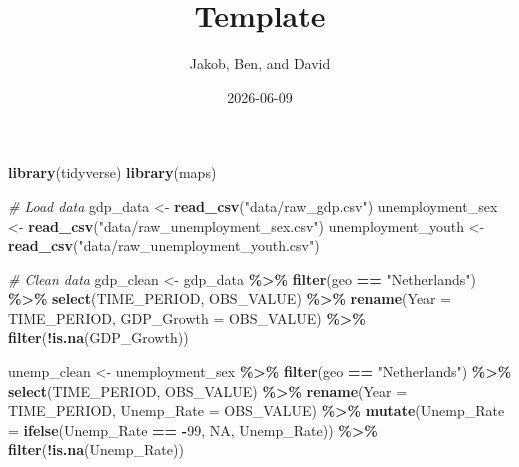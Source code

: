 \documentclass[
]{article}
\title{Template}
\author{Jakob, Ben, and David}
\date{2026-06-09}
\newenvironment{Shaded}{\begin{snugshade}}{\end{snugshade}}
\newcommand{\AttributeTok}[1]{\textcolor[rgb]{0.13,0.29,0.53}{#1}}
\newcommand{\CommentTok}[1]{\textcolor[rgb]{0.56,0.35,0.01}{\textit{#1}}}
\newcommand{\ConstantTok}[1]{\textcolor[rgb]{0.56,0.35,0.01}{#1}}
\newcommand{\DecValTok}[1]{\textcolor[rgb]{0.00,0.00,0.81}{#1}}
\newcommand{\FunctionTok}[1]{\textcolor[rgb]{0.13,0.29,0.53}{\textbf{#1}}}
\newcommand{\NormalTok}[1]{#1}
\newcommand{\OtherTok}[1]{\textcolor[rgb]{0.56,0.35,0.01}{#1}}
\newcommand{\SpecialCharTok}[1]{\textcolor[rgb]{0.81,0.36,0.00}{\textbf{#1}}}
\newcommand{\StringTok}[1]{\textcolor[rgb]{0.31,0.60,0.02}{#1}}
\begin{document}
\maketitle

\begin{Shaded}
\begin{Highlighting}[]
\FunctionTok{library}\NormalTok{(tidyverse)}
\FunctionTok{library}\NormalTok{(maps)}

\CommentTok{\# Load data}
\NormalTok{gdp\_data           }\OtherTok{\textless{}{-}} \FunctionTok{read\_csv}\NormalTok{(}\StringTok{"data/raw\_gdp.csv"}\NormalTok{)}
\NormalTok{unemployment\_sex   }\OtherTok{\textless{}{-}} \FunctionTok{read\_csv}\NormalTok{(}\StringTok{"data/raw\_unemployment\_sex.csv"}\NormalTok{)}
\NormalTok{unemployment\_youth }\OtherTok{\textless{}{-}} \FunctionTok{read\_csv}\NormalTok{(}\StringTok{"data/raw\_unemployment\_youth.csv"}\NormalTok{)}

\CommentTok{\# Clean data}
\NormalTok{gdp\_clean }\OtherTok{\textless{}{-}}\NormalTok{ gdp\_data }\SpecialCharTok{\%\textgreater{}\%} 
  \FunctionTok{filter}\NormalTok{(geo }\SpecialCharTok{==} \StringTok{"Netherlands"}\NormalTok{) }\SpecialCharTok{\%\textgreater{}\%}
  \FunctionTok{select}\NormalTok{(TIME\_PERIOD, OBS\_VALUE) }\SpecialCharTok{\%\textgreater{}\%}
  \FunctionTok{rename}\NormalTok{(}\AttributeTok{Year =}\NormalTok{ TIME\_PERIOD, }\AttributeTok{GDP\_Growth =}\NormalTok{ OBS\_VALUE) }\SpecialCharTok{\%\textgreater{}\%}
  \FunctionTok{filter}\NormalTok{(}\SpecialCharTok{!}\FunctionTok{is.na}\NormalTok{(GDP\_Growth))}

\NormalTok{unemp\_clean }\OtherTok{\textless{}{-}}\NormalTok{ unemployment\_sex }\SpecialCharTok{\%\textgreater{}\%} 
  \FunctionTok{filter}\NormalTok{(geo }\SpecialCharTok{==} \StringTok{"Netherlands"}\NormalTok{) }\SpecialCharTok{\%\textgreater{}\%}
  \FunctionTok{select}\NormalTok{(TIME\_PERIOD, OBS\_VALUE) }\SpecialCharTok{\%\textgreater{}\%}
  \FunctionTok{rename}\NormalTok{(}\AttributeTok{Year =}\NormalTok{ TIME\_PERIOD, }\AttributeTok{Unemp\_Rate =}\NormalTok{ OBS\_VALUE) }\SpecialCharTok{\%\textgreater{}\%}
  \FunctionTok{mutate}\NormalTok{(}\AttributeTok{Unemp\_Rate =} \FunctionTok{ifelse}\NormalTok{(Unemp\_Rate }\SpecialCharTok{==} \SpecialCharTok{{-}}\DecValTok{99}\NormalTok{, }\ConstantTok{NA}\NormalTok{, Unemp\_Rate)) }\SpecialCharTok{\%\textgreater{}\%}
  \FunctionTok{filter}\NormalTok{(}\SpecialCharTok{!}\FunctionTok{is.na}\NormalTok{(Unemp\_Rate))}


\end{Highlighting}
\end{Shaded}
\end{document}
